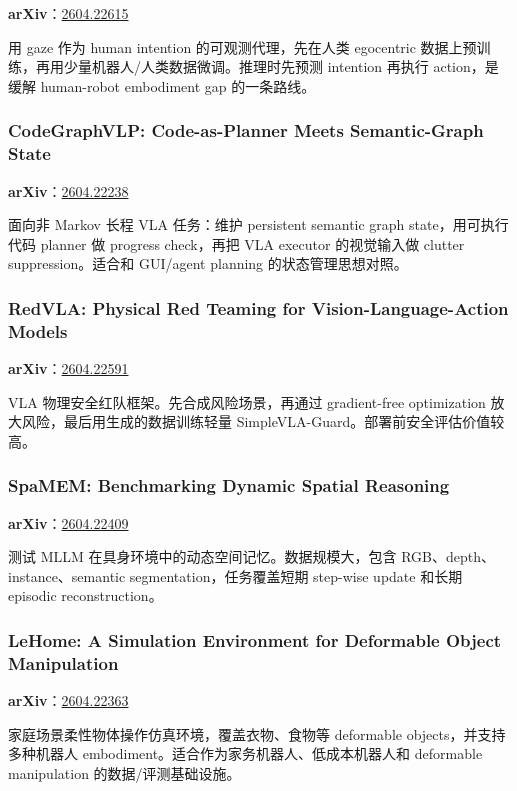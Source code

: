 \textbf{arXiv}：\href{https://arxiv.org/abs/2604.22615}{2604.22615}

用 gaze 作为 human intention 的可观测代理，先在人类 egocentric 数据上预训练，再用少量机器人/人类数据微调。推理时先预测 intention 再执行 action，是缓解 human-robot embodiment gap 的一条路线。

\subsubsection{CodeGraphVLP: Code-as-Planner Meets Semantic-Graph State}

\textbf{arXiv}：\href{https://arxiv.org/abs/2604.22238}{2604.22238}

面向非 Markov 长程 VLA 任务：维护 persistent semantic graph state，用可执行代码 planner 做 progress check，再把 VLA executor 的视觉输入做 clutter suppression。适合和 GUI/agent planning 的状态管理思想对照。

\subsubsection{RedVLA: Physical Red Teaming for Vision-Language-Action Models}

\textbf{arXiv}：\href{https://arxiv.org/abs/2604.22591}{2604.22591}

VLA 物理安全红队框架。先合成风险场景，再通过 gradient-free optimization 放大风险，最后用生成的数据训练轻量 SimpleVLA-Guard。部署前安全评估价值较高。

\subsubsection{SpaMEM: Benchmarking Dynamic Spatial Reasoning}

\textbf{arXiv}：\href{https://arxiv.org/abs/2604.22409}{2604.22409}

测试 MLLM 在具身环境中的动态空间记忆。数据规模大，包含 RGB、depth、instance、semantic segmentation，任务覆盖短期 step-wise update 和长期 episodic reconstruction。

\subsubsection{LeHome: A Simulation Environment for Deformable Object Manipulation}

\textbf{arXiv}：\href{https://arxiv.org/abs/2604.22363}{2604.22363}

家庭场景柔性物体操作仿真环境，覆盖衣物、食物等 deformable objects，并支持多种机器人 embodiment。适合作为家务机器人、低成本机器人和 deformable manipulation 的数据/评测基础设施。

